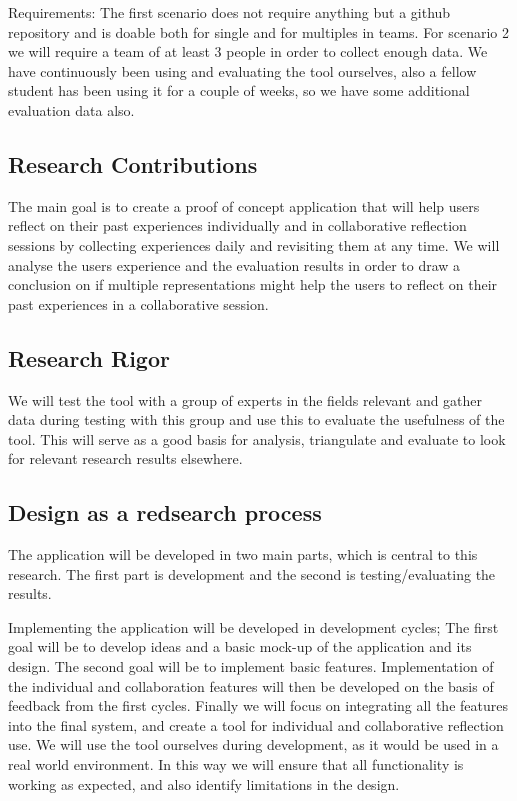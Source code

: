 Requirements: 
The first scenario does not require anything but a github repository and is doable both for single and for multiples in teams.
For scenario 2 we will require a team of at least 3 people in order to collect enough data. 
We have continuously been using and evaluating the tool ourselves, also a fellow student has been using it for a couple of weeks, so we have some additional evaluation
data also.

\subsection{Research Contributions}
The main goal is to create a proof of concept application that will help users reflect on their past experiences individually and in collaborative reflection sessions by collecting experiences daily and revisiting them at any time. We will analyse the users experience and the evaluation results  in order to draw a conclusion on if multiple representations might help the users to reflect on their past experiences in a collaborative session.

\subsection{Research Rigor}
We will test the tool with a group of experts in the fields relevant and gather data during testing with this group and use this to evaluate the usefulness of the tool. This will serve as a good basis for analysis, triangulate and evaluate to look for relevant research results elsewhere.

\subsection{Design as a redsearch process}
The application will be developed in two main parts, which is central to this research. The first part is development and the second is testing/evaluating the results.

Implementing the application will be developed in development cycles; The first goal will be to develop ideas and a basic mock-up of the application and its design. The second goal will be to implement basic features. Implementation of the individual and collaboration features will then be developed on the basis of feedback from the first cycles. Finally we will focus on integrating all the features into the final system, and create a tool for individual and collaborative reflection use. We will use the tool ourselves during development, as it would be used in a real world environment. In this way we will ensure that all functionality is working as expected, and also identify limitations in the design. 


